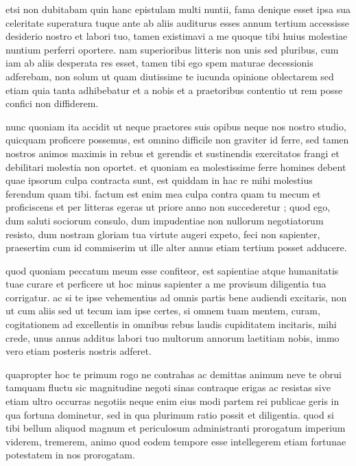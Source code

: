 


 etsi non dubitabam quin hanc epistulam multi nuntii, fama denique esset ipsa sua celeritate superatura tuque ante ab aliis auditurus esses annum tertium accessisse desiderio nostro et labori tuo, tamen existimavi a me quoque tibi huius molestiae nuntium perferri oportere. nam superioribus litteris non unis sed pluribus, cum iam ab aliis desperata res esset, tamen tibi ego spem maturae decessionis adferebam, non solum ut quam diutissime te iucunda opinione oblectarem sed etiam quia tanta adhibebatur et a nobis et a praetoribus contentio ut rem posse confici non diffiderem.

 nunc quoniam ita accidit ut neque praetores suis opibus neque nos nostro studio, quicquam proficere possemus, est omnino difficile non graviter id ferre, sed tamen nostros animos maximis in rebus et gerendis et sustinendis exercitatos frangi et debilitari molestia non oportet. et quoniam ea molestissime ferre homines debent quae ipsorum culpa contracta sunt, est quiddam in hac re mihi molestius ferendum quam tibi. factum est enim mea culpa contra quam tu mecum et proficiscens et per litteras egeras ut priore anno non succederetur ; quod ego, dum saluti sociorum consulo, dum impudentiae non nullorum negotiatorum resisto, dum nostram gloriam tua virtute augeri expeto, feci non sapienter, praesertim cum id commiserim ut ille alter annus etiam tertium posset adducere.

 quod quoniam peccatum meum esse confiteor, est sapientiae atque humanitatis tuae curare et perficere ut hoc minus sapienter a me provisum diligentia tua corrigatur. ac si te ipse vehementius ad omnis partis bene audiendi excitaris, non ut cum aliis sed ut tecum iam ipse certes, si omnem tuam mentem, curam, cogitationem ad excellentis in omnibus rebus laudis cupiditatem incitaris, mihi crede, unus annus additus labori tuo multorum annorum laetitiam nobis, immo vero etiam posteris nostris adferet.

 quapropter hoc te primum rogo ne contrahas ac demittas animum neve te obrui tamquam fluctu sic magnitudine negoti sinas contraque erigas ac resistas sive etiam ultro occurras negotiis neque enim eius modi partem rei publicae geris in qua fortuna dominetur, sed in qua plurimum ratio possit et diligentia. quod si tibi bellum aliquod magnum et periculosum administranti prorogatum imperium viderem, tremerem, animo quod eodem tempore esse intellegerem etiam fortunae potestatem in nos prorogatam.

